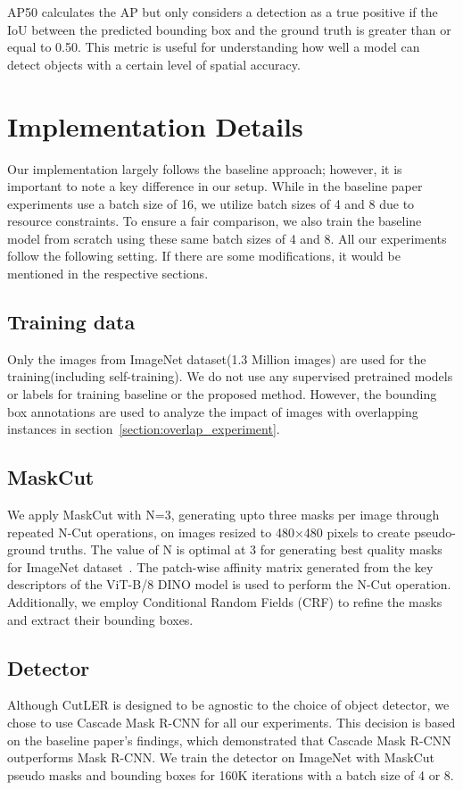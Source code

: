 AP50 calculates the AP but only considers a detection as a true positive if the IoU between the predicted bounding box and the ground truth is greater than or equal to 0.50. This metric is useful for understanding how well a model can detect objects with a certain level of spatial accuracy.

\section{Implementation Details}
\label{section:implementation_details}
Our implementation largely follows the baseline approach; however, it is important to note a key difference in our setup. While in the baseline paper experiments use a batch size of 16, we utilize batch sizes of 4 and 8 due to resource constraints. To ensure a fair comparison, we also train the baseline model from scratch using these same batch sizes of 4 and 8. All our experiments follow the following setting. If there are some modifications, it would be mentioned in the respective sections.

\subsection{Training data}
Only the images from ImageNet dataset(1.3 Million images) are used for the training(including self-training). We do not use any supervised pretrained models or labels for training baseline or the proposed method. However, the bounding box annotations are used to analyze the impact of images with overlapping instances in section~\ref{section:overlap_experiment}.

\subsection{MaskCut}

We apply MaskCut with N=3, generating upto three masks per image through repeated N-Cut operations, on images resized to 480×480 pixels to create pseudo-ground truths. The value of N is optimal at 3 for generating best quality masks for ImageNet dataset~\cite{wang2023cut}. The patch-wise affinity matrix generated from the key descriptors of the ViT-B/8 DINO model is used to perform the N-Cut operation. Additionally, we employ Conditional Random Fields (CRF) to refine the masks and extract their bounding boxes.

\subsection{Detector}
Although CutLER is designed to be agnostic to the choice of object detector, we chose to use Cascade Mask R-CNN for all our experiments. This decision is based on the baseline paper's findings, which demonstrated that Cascade Mask R-CNN outperforms Mask R-CNN. We train the detector on ImageNet with MaskCut pseudo masks and bounding boxes for 160K iterations with a batch size of 4 or 8. 

